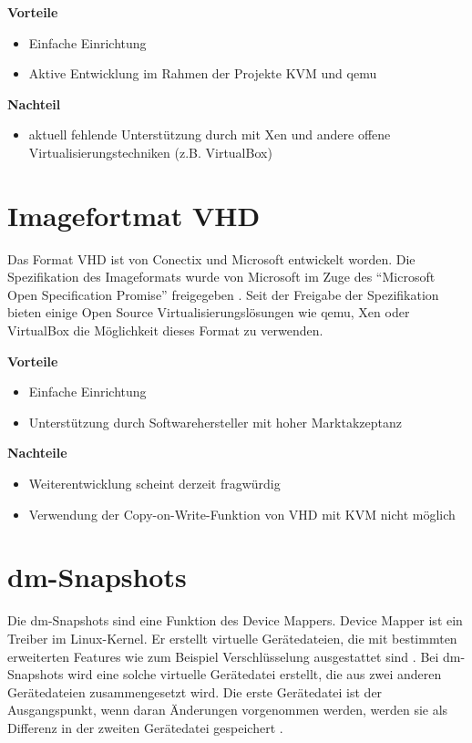 \textbf{Vorteile}
\begin{itemize}
 \item Einfache Einrichtung
 \item Aktive Entwicklung im Rahmen der Projekte KVM und qemu
\end{itemize}

\textbf{Nachteil}
\begin{itemize}
 \item aktuell fehlende Unterstützung durch mit Xen und andere offene Virtualisierungstechniken (z.B. VirtualBox)
\end{itemize}

\section{Imagefortmat VHD}
Das Format VHD ist von Conectix und Microsoft entwickelt worden. Die Spezifikation des Imageformats wurde von Microsoft im Zuge des ``Microsoft Open Specification Promise'' freigegeben \cite{msosp} \cite{vhdspec}. Seit der Freigabe der Spezifikation bieten einige Open Source Virtualisierungslösungen wie qemu, Xen oder VirtualBox die Möglichkeit dieses Format zu verwenden.   

\textbf{Vorteile}
\begin{itemize}
 \item Einfache Einrichtung
 \item Unterstützung durch Softwarehersteller mit hoher Marktakzeptanz
\end{itemize}

\textbf{Nachteile}
\begin{itemize}
 \item Weiterentwicklung scheint derzeit fragwürdig
 \item Verwendung der Copy-on-Write-Funktion von VHD mit KVM nicht möglich
\end{itemize}

\section{dm-Snapshots}
Die dm-Snapshots sind eine Funktion des Device Mappers. Device Mapper ist ein Treiber im Linux-Kernel. Er erstellt virtuelle Gerätedateien, die mit bestimmten erweiterten Features wie zum Beispiel Verschlüsselung ausgestattet sind \cite{dmmbroz}. Bei dm-Snapshots wird eine solche virtuelle Gerätedatei erstellt, die aus zwei anderen Gerätedateien zusammengesetzt wird. Die erste Gerätedatei ist der Ausgangspunkt, wenn daran Änderungen vorgenommen werden, werden sie als Differenz in der zweiten Gerätedatei gespeichert \cite{dmkerneldoc}. 

